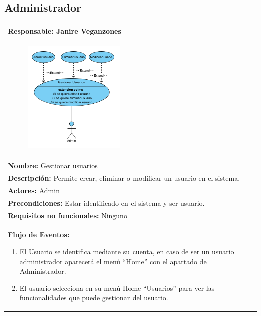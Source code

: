 \documentclass{report}
\begin{document}
\subsection{Administrador}
        \begin{center}
            \begin{longtable}{|p{\linewidth}|}
                \hline
                \textbf{Responsable:} Janire Veganzones\\
                \hline
                \begin{figure}[H]
                    \centering
                    \includegraphics[width=0.45\textwidth]{./img/casos_uso/CasoDeUsoGestionUsu.png}
                \end{figure}\\
                \hline
                \textbf{Nombre:} Gestionar usuarios\\
                \hline
                \textbf{Descripción:}  Permite crear, eliminar o modificar un usuario en el sistema.\\
                \hline
                \textbf{Actores:} Admin\\
                \hline
                \textbf{Precondiciones:} Estar identificado en el sistema y ser usuario.\\
                \hline
                \textbf{Requisitos no funcionales:} Ninguno\\
                \hline
                \textbf{Flujo de Eventos:}
                \begin{enumerate}
                    \item El Usuario se identifica mediante su cuenta, en caso de ser un usuario administrador aparecerá el menú “Home” con el apartado de Administrador.
                    \item El usuario selecciona en su menú Home “Usuarios” para ver las funcionalidades que puede gestionar del usuario.

\end{enumerate}
\end{longtable}
\end{center}
\end{document}
